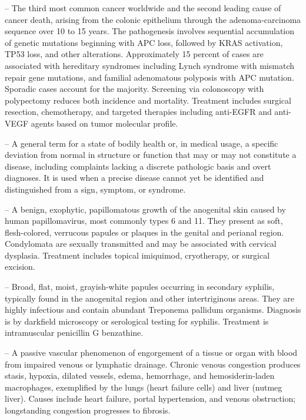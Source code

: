 -- The third most common cancer worldwide and the second leading cause of cancer death, arising from the colonic epithelium through the adenoma-carcinoma sequence over 10 to 15 years. The pathogenesis involves sequential accumulation of genetic mutations beginning with APC loss, followed by KRAS activation, TP53 loss, and other alterations. Approximately 15 percent of cases are associated with hereditary syndromes including Lynch syndrome with mismatch repair gene mutations, and familial adenomatous polyposis with APC mutation. Sporadic cases account for the majority. Screening via colonoscopy with polypectomy reduces both incidence and mortality. Treatment includes surgical resection, chemotherapy, and targeted therapies including anti-EGFR and anti-VEGF agents based on tumor molecular profile.

-- A general term for a state of bodily health or, in medical usage, a specific deviation from normal in structure or function that may or may not constitute a disease, including complaints lacking a discrete pathologic basis and overt diagnoses. It is used when a precise disease cannot yet be identified and distinguished from a sign, symptom, or syndrome.

-- A benign, exophytic, papillomatous growth of the anogenital skin caused by human papillomavirus, most commonly types 6 and 11. They present as soft, flesh-colored, verrucous papules or plaques in the genital and perianal region. Condylomata are sexually transmitted and may be associated with cervical dysplasia. Treatment includes topical imiquimod, cryotherapy, or surgical excision.

-- Broad, flat, moist, grayish-white papules occurring in secondary syphilis, typically found in the anogenital region and other intertriginous areas. They are highly infectious and contain abundant Treponema pallidum organisms. Diagnosis is by darkfield microscopy or serological testing for syphilis. Treatment is intramuscular penicillin G benzathine.

-- A passive vascular phenomenon of engorgement of a tissue or organ with blood from impaired venous or lymphatic drainage. Chronic venous congestion produces stasis, hypoxia, dilated vessels, edema, hemorrhage, and hemosiderin-laden macrophages, exemplified by the lungs (heart failure cells) and liver (nutmeg liver). Causes include heart failure, portal hypertension, and venous obstruction; longstanding congestion progresses to fibrosis.

